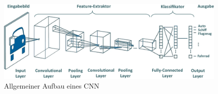 \begin{figure}[!hb]
	\centering
	\includegraphics[width=\linewidth]{images/imgKlassifizierungProzess}
	\caption{Allgemeiner Aufbau eines CNN \protect\cite{Zschech2021}}
	\label{fig:imgKlassifizierungProzess}
\end{figure}



